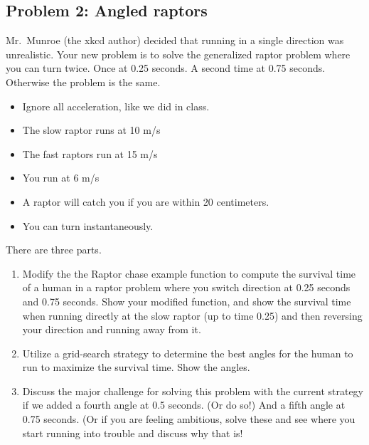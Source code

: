 \documentclass[]{article}
\providecommand{\tightlist}{%
  \setlength{\itemsep}{0pt}\setlength{\parskip}{0pt}}
\begin{document}
\hypertarget{problem-2-angled-raptors}{%
\subsection{Problem 2: Angled raptors}\label{problem-2-angled-raptors}}

Mr.~Munroe (the xkcd author) decided that running in a single direction
was unrealistic. Your new problem is to solve the generalized raptor
problem where you can turn twice. Once at 0.25 seconds. A second time at
0.75 seconds. Otherwise the problem is the same.

\begin{itemize}
\tightlist
\item
  Ignore all acceleration, like we did in class.
\item
  The slow raptor runs at 10 m/s
\item
  The fast raptors run at 15 m/s
\item
  You run at 6 m/s
\item
  A raptor will catch you if you are within 20 centimeters.
\item
  You can turn instantaneously.
\end{itemize}

There are three parts.

\begin{enumerate}
\def\labelenumi{\arabic{enumi}.}
\item
  Modify the the Raptor chase example function to compute the survival
  time of a human in a raptor problem where you switch direction at 0.25
  seconds and 0.75 seconds. Show your modified function, and show the
  survival time when running directly at the slow raptor (up to time
  0.25) and then reversing your direction and running away from it.
\item
  Utilize a grid-search strategy to determine the best angles for the
  human to run to maximize the survival time. Show the angles.
\item
  Discuss the major challenge for solving this problem with the current
  strategy if we added a fourth angle at 0.5 seconds. (Or do so!) And a
  fifth angle at 0.75 seconds. (Or if you are feeling ambitious, solve
  these and see where you start running into trouble and discuss why
  that is!
\end{enumerate}
\end{document}

